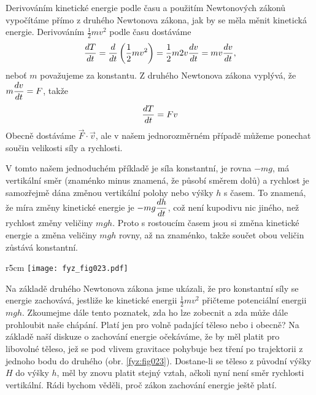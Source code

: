 {    Derivováním kinetické energie podle času a použitím Newtonových zákonů vypočítáme přímo z 
    druhého Newtonova zákona, jak by se měla měnit kinetická energie. Derivováním 
    \(\frac{1}{2}mv^2\) podle času dostáváme
    \begin{equation}\label{FYZ:eq026}
      \dfrac{d T}{d t} = \dfrac{d  }{d t}\left(\frac{1}{2}mv^2\right) = \frac{1}{2}m2v\dfrac{d v}{d t} 
                 = mv\dfrac{d v}{d t},
    \end{equation}
    neboť \(m\) považujeme za konstantu. Z druhého Newtonova zákona vyplývá, že \(m\dfrac{d v}{d t} = 
    F\), takže
    \begin{equation}\label{FYZ:eq027}
      \dfrac{d T}{d t} =Fv
    \end{equation}
    Obecně dostáváme \(\vec{F}\cdot\vec{v}\), ale v našem jednorozměrném případě můžeme ponechat 
    součin velikosti síly a rychlosti. 
    
    V tomto našem jednoduchém příkladě je síla konstantní, je rovna \(- mg\), má vertikální směr 
    (znaménko minus znamená, že působí směrem dolů) a rychlost je samozřejmě dána změnou vertikální 
    polohy nebo výšky \(h\) s časem. To znamená, že míra změny kinetické energie je \(- 
    mg\dfrac{d h}{d t}\), což není kupodivu nic jiného, než rychlost změny veličiny \(mgh\). Proto s 
    rostoucím časem jsou si změna kinetické energie a změna veličiny \(mgh\) rovny, až na znaménko, 
    takže součet obou veličin zůstává konstantní.
    
    \begin{wrapfigure}[14]{r}{5cm}  %
      \centering
      \texttt{[image: fyz\_fig023.pdf]}
      \caption{Těleso pohybující se bez tření po zakřivené trajektorii pod vlivem gravitační síly
               (\cite[s.~186]{Feynman01})}
      \label{fyz:fig023}
    \end{wrapfigure}
    Na základě druhého Newtonova zákona jsme ukázali, že pro konstantní síly se energie zachovává, 
    jestliže ke kinetické energii \(\frac{1}{2}mv^2\) přičteme potenciální energii \(mgh\). 
    Zkoumejme dále tento poznatek, zda ho lze zobecnit a zda může dále prohloubit naše chápání. 
    Platí jen pro volně padající těleso nebo i obecně? Na základě naší diskuze o zachování energie 
    očekáváme, že by měl platit pro libovolné těleso, jež se pod vlivem gravitace pohybuje bez 
    tření po trajektorii z jednoho bodu do druhého (obr. \ref{fyz:fig023}). Dostane-li se těleso z 
    původní výšky \(H\) do výšky \(h\), měl by znovu platit stejný vztah, ačkoli nyní není směr 
    rychlosti vertikální. Rádi bychom věděli, proč zákon zachování energie ještě platí.
    
}
